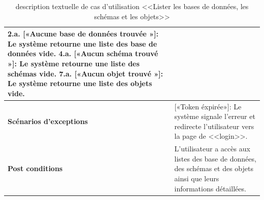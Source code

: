 \begin{enumerate}
\begin{table}[H]
\begin{tabular}{|p{3.5cm}|p{12cm}|}
                    2.a. \hspace{0.3cm} [«Aucune base de données trouvée »]: Le système retourne une liste des base de données vide.
                    4.a. \hspace{0.3cm} [«Aucun schéma trouvé »]: Le système retourne une liste des schémas vide.
                    7.a. \hspace{0.3cm} [«Aucun objet trouvé »]: Le système retourne une liste des objets vide.\\
            \hline  \textbf{Scénarios d'exceptions} & 
              [«Token éxpirée»]: Le système signale l'erreur et redirecte l'utilisateur vers la page de <<login>>.\\
            \hline \textbf{Post conditions} & L'utilisateur a accès aux listes des base de données, des schémas et des objets ainsi que leurs informations détaillées.\\
            \hline 
        \end{tabular}
        \caption{description textuelle de cas d'utilisation <<Lister les bases de données, les schémas et les objets>>}
        \end{table}
\end{enumerate}
